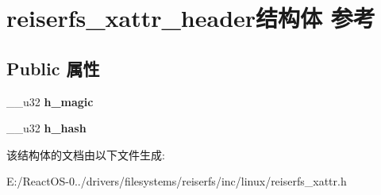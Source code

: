 \hypertarget{structreiserfs__xattr__header}{}\section{reiserfs\+\_\+xattr\+\_\+header结构体 参考}
\label{structreiserfs__xattr__header}
\subsection*{Public 属性}
\begin{DoxyCompactItemize}
\item 
\mbox{\label{structreiserfs__xattr__header_a9b7def07630d987621f16eb91330d006}} 
\+\_\+\+\_\+u32 {\bfseries h\+\_\+magic}
\item 
\mbox{\label{structreiserfs__xattr__header_a41ddfee5323298151d4aba92dcacd126}} 
\+\_\+\+\_\+u32 {\bfseries h\+\_\+hash}
\end{DoxyCompactItemize}


该结构体的文档由以下文件生成\+:\begin{DoxyCompactItemize}
\item 
E\+:/\+React\+O\+S-\/0../drivers/filesystems/reiserfs/inc/linux/reiserfs\+\_\+xattr.\+h\end{DoxyCompactItemize}

